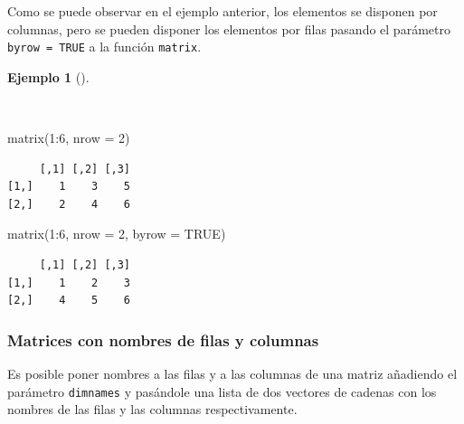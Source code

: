 \documentclass[
  spanish,
  a4paper,
]{scrreport}
\newenvironment{Shaded}{\begin{snugshade}}{\end{snugshade}}
\newcommand{\AttributeTok}[1]{\textcolor[rgb]{0.40,0.45,0.13}{#1}}
\newcommand{\ConstantTok}[1]{\textcolor[rgb]{0.56,0.35,0.01}{#1}}
\newcommand{\DecValTok}[1]{\textcolor[rgb]{0.68,0.00,0.00}{#1}}
\newcommand{\FunctionTok}[1]{\textcolor[rgb]{0.28,0.35,0.67}{#1}}
\newcommand{\NormalTok}[1]{\textcolor[rgb]{0.00,0.23,0.31}{#1}}
\newcommand{\SpecialCharTok}[1]{\textcolor[rgb]{0.37,0.37,0.37}{#1}}
\theoremstyle{definition}
\theoremstyle{definition}
\newtheorem{example}{Ejemplo}[chapter]
\theoremstyle{remark}
\begin{document}
Como se puede observar en el ejemplo anterior, los elementos se disponen
por columnas, pero se pueden disponer los elementos por filas pasando el
parámetro \texttt{byrow\ =\ TRUE} a la función \texttt{matrix}.

\begin{example}[]\protect\hypertarget{exm-creacion-matrices-por-filas}{}\label{exm-creacion-matrices-por-filas}

~

\begin{Shaded}
\begin{Highlighting}[]
\FunctionTok{matrix}\NormalTok{(}\DecValTok{1}\SpecialCharTok{:}\DecValTok{6}\NormalTok{, }\AttributeTok{nrow =} \DecValTok{2}\NormalTok{)}
\end{Highlighting}
\end{Shaded}

\begin{verbatim}
     [,1] [,2] [,3]
[1,]    1    3    5
[2,]    2    4    6
\end{verbatim}

\begin{Shaded}
\begin{Highlighting}[]
\FunctionTok{matrix}\NormalTok{(}\DecValTok{1}\SpecialCharTok{:}\DecValTok{6}\NormalTok{, }\AttributeTok{nrow =} \DecValTok{2}\NormalTok{, }\AttributeTok{byrow =} \ConstantTok{TRUE}\NormalTok{)}
\end{Highlighting}
\end{Shaded}

\begin{verbatim}
     [,1] [,2] [,3]
[1,]    1    2    3
[2,]    4    5    6
\end{verbatim}

\end{example}

\subsubsection{Matrices con nombres de filas y
columnas}\label{matrices-con-nombres-de-filas-y-columnas}

Es posible poner nombres a las filas y a las columnas de una matriz
añadiendo el parámetro \texttt{dimnames} y pasándole una lista de dos
vectores de cadenas con los nombres de las filas y las columnas
respectivamente.
\end{document}
